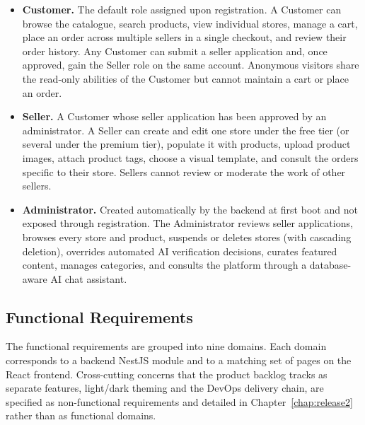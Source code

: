 \begin{itemize}[leftmargin=*,itemsep=4pt]
  \item \textbf{Customer.} The default role assigned upon registration.
        A Customer can browse the catalogue, search products, view
        individual stores, manage a cart, place an order across multiple
        sellers in a single checkout, and review their order history.
        Any Customer can submit a seller application and, once approved,
        gain the Seller role on the same account. Anonymous visitors
        share the read-only abilities of the Customer but cannot
        maintain a cart or place an order.
  \item \textbf{Seller.} A Customer whose seller application has been
        approved by an administrator. A Seller can create and edit one
        store under the free tier (or several under the premium tier),
        populate it with products, upload product images, attach product
        tags, choose a visual template, and consult the orders specific
        to their store. Sellers cannot review or moderate the work of
        other sellers.
  \item \textbf{Administrator.} Created automatically by the backend at
        first boot and not exposed through registration. The
        Administrator reviews seller applications, browses every store
        and product, suspends or deletes stores (with cascading
        deletion), overrides automated AI verification decisions,
        curates featured content, manages categories, and consults the
        platform through a database-aware AI chat assistant.
\end{itemize}

\clearpage
\subsection{Functional Requirements}

The functional requirements are grouped into nine domains. Each domain
corresponds to a backend NestJS module and to a matching set of pages on
the React frontend. Cross-cutting concerns that the product backlog tracks
as separate features, light/dark theming and the DevOps delivery chain,
are specified as non-functional requirements and detailed in
Chapter~\ref{chap:release2} rather than as functional domains.


